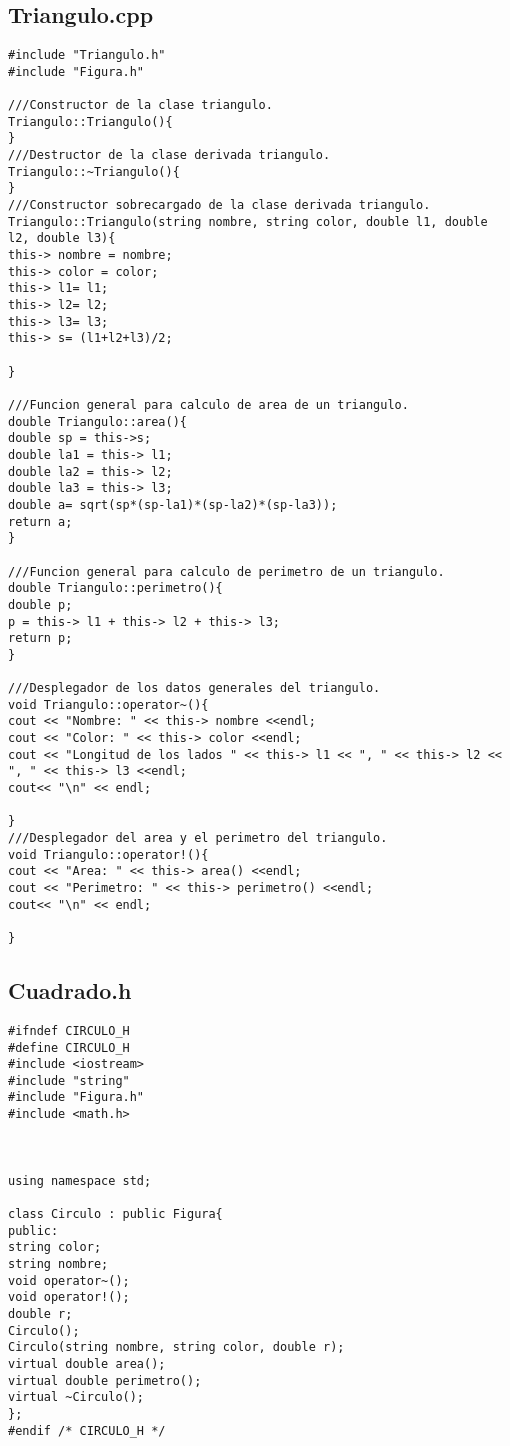\documentclass[11pt]{article}
\begin{document}
\subsection{Triangulo.cpp}
\begin{lstlisting}
#include "Triangulo.h"
#include "Figura.h"

///Constructor de la clase triangulo.
Triangulo::Triangulo(){
}
///Destructor de la clase derivada triangulo.
Triangulo::~Triangulo(){
}
///Constructor sobrecargado de la clase derivada triangulo.
Triangulo::Triangulo(string nombre, string color, double l1, double l2, double l3){
this-> nombre = nombre;
this-> color = color;
this-> l1= l1;
this-> l2= l2;
this-> l3= l3;
this-> s= (l1+l2+l3)/2;

}

///Funcion general para calculo de area de un triangulo.
double Triangulo::area(){
double sp = this->s;
double la1 = this-> l1;
double la2 = this-> l2;
double la3 = this-> l3;
double a= sqrt(sp*(sp-la1)*(sp-la2)*(sp-la3));
return a;
}

///Funcion general para calculo de perimetro de un triangulo.
double Triangulo::perimetro(){
double p;
p = this-> l1 + this-> l2 + this-> l3;
return p;
}

///Desplegador de los datos generales del triangulo.
void Triangulo::operator~(){
cout << "Nombre: " << this-> nombre <<endl;
cout << "Color: " << this-> color <<endl;
cout << "Longitud de los lados " << this-> l1 << ", " << this-> l2 << ", " << this-> l3 <<endl;
cout<< "\n" << endl;

}
///Desplegador del area y el perimetro del triangulo.
void Triangulo::operator!(){
cout << "Area: " << this-> area() <<endl;
cout << "Perimetro: " << this-> perimetro() <<endl;
cout<< "\n" << endl;

}

\end{lstlisting}

\subsection{Cuadrado.h}
\begin{lstlisting}
#ifndef CIRCULO_H
#define CIRCULO_H
#include <iostream>
#include "string"
#include "Figura.h"
#include <math.h> 



using namespace std;

class Circulo : public Figura{
public:
string color;
string nombre;
void operator~();
void operator!();
double r;
Circulo();
Circulo(string nombre, string color, double r);
virtual double area();
virtual double perimetro();
virtual ~Circulo();
};
#endif /* CIRCULO_H */

\end{lstlisting}
\end{document}

